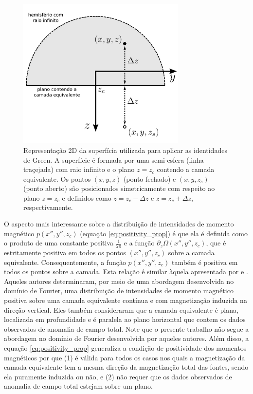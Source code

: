 \begin{figure}[H]
	\centering
	\includegraphics[width=0.75\textwidth]{Fig/eqlayer/surface_Green.png}
	\caption{ Representação 2D da superfícia utilizada para aplicar as identidades de Green. A superfície é formada por uma semi-esfera (linha traçejada) com raio infinito e o plano $z = z_{c}$ contendo a camada equivalente. Os pontos $(x, y, z)$ (ponto fechado) e $(x, y, z_{s})$ (ponto aberto) são posicionados simetricamente com respeito ao plano $z = z_{c}$ e definidos como $z = z_{c} - \Delta z$ e $z = z_{c} + \Delta z$, respectivamente.}
	\label{fig:surface_Green}
\end{figure}

O aspecto mais interessante sobre a distribuição de intensidades de momento magnético 
$p(x'', y'', z_{c})$ (equação \ref{eq:positivity_prop}) é que ela é definida como o produto de 
uma constante positiva $\frac{1}{2\pi}$ e a função $\partial_{z} \Omega(x'',y'',z_{c})$, que é 
estritamente positiva em todos os pontos $(x'',y'',z_{c})$ sobre a camada equivalente. 
Consequentemente, a função $p(x'', y'', z_{c})$ também é positiva em todos os pontos sobre a camada. 
Esta relação é similar àquela apresentada por \cite{pedersen1991} e \cite{li_etal_2014}. 
Aqueles autores determinaram, por meio de uma abordagem desenvolvida no domínio de Fourier, 
uma distribuição de intensidades de momento magnético positiva sobre uma camada equivalente 
contínua e com magnetização induzida na direção vertical. Eles também 
consideraram que a camada equivalente é plana, localizada em profundidade e é paralela 
ao plano horizontal que contem os dados observados de anomalia de campo total. 
Note que o presente trabalho não segue a abordagem no domínio de Fourier desenvolvida por aqueles 
autores. Além disso, a equação \ref{eq:positivity_prop} generaliza a condição de positividade dos 
momentos magnéticos por que (1) é válida para todos os casos nos quais a magnetização da camada 
equivalente tem a mesma direção da magnetização total das fontes, sendo ela puramente induzida ou não, 
e (2) não requer que os dados observados de anomalia de campo total estejam sobre um plano.


